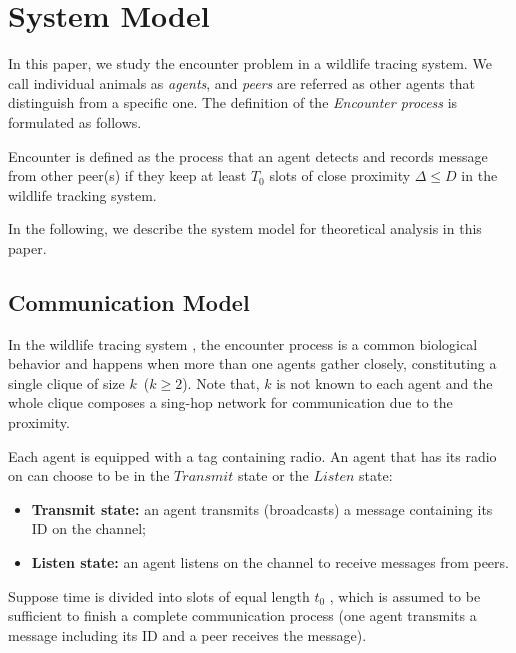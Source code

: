 \section{System Model}
\label{sectionmodel}

In this paper, we study the encounter problem in a wildlife 
tracing system. 
We call individual animals as \emph{agents}, 
and \emph{peers} are referred as other agents that distinguish from 
a specific one.
The definition of the \emph{Encounter process} is formulated as follows.
\begin{definition}
Encounter is defined as the process that 
an agent detects and records message
from other peer(s) if they keep at least $T_0$ slots of 
close proximity $\Delta \leq D$
in the wildlife tracking system. 
\end{definition}

In the following, we describe the system model for theoretical analysis in this paper.



\subsection{Communication Model}


In the  wildlife tracing system {\sysname}, the encounter process 
is a common biological behavior and
happens when more than one agents gather closely, constituting a 
single clique of size $k$~($k \geq 2$).
Note that, $k$ is not known to each agent and the whole 
clique composes a sing-hop network for communication due to the proximity. 

Each agent is equipped with a tag containing radio. 
An agent that has its radio on can choose to be in the $Transmit$ state
or the $Listen$ state:
\begin{itemize}
\item \textbf{Transmit state:} an agent transmits (broadcasts) 
a message containing its ID on the channel;
\item  \textbf{Listen state:} an agent listens on 
the channel to receive messages from peers.
\end{itemize}

Suppose time is divided into slots of equal length $t_0$
, which is assumed to be sufficient to finish a complete
communication process (one agent transmits a message including its ID and
a peer receives the message).

